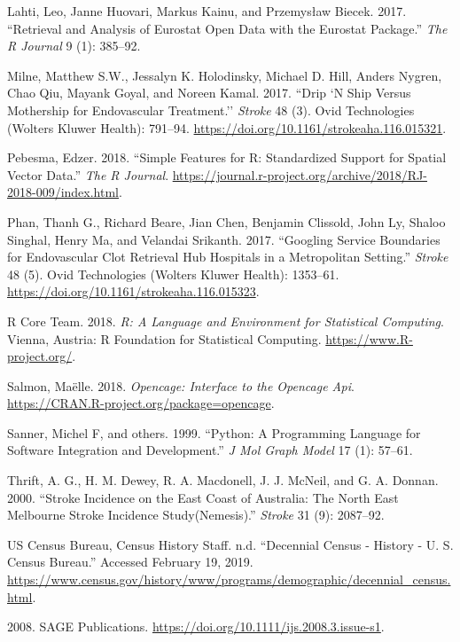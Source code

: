 \documentclass[]{article}
\begin{document}
\leavevmode\hypertarget{ref-Lahti2017}{}%
Lahti, Leo, Janne Huovari, Markus Kainu, and Przemysław Biecek. 2017.
``Retrieval and Analysis of Eurostat Open Data with the Eurostat
Package.'' \emph{The R Journal} 9 (1): 385--92.

\leavevmode\hypertarget{ref-Milne_2017}{}%
Milne, Matthew S.W., Jessalyn K. Holodinsky, Michael D. Hill, Anders
Nygren, Chao Qiu, Mayank Goyal, and Noreen Kamal. 2017. ``Drip `N Ship
Versus Mothership for Endovascular Treatment.'' \emph{Stroke} 48 (3).
Ovid Technologies (Wolters Kluwer Health): 791--94.
\url{https://doi.org/10.1161/strokeaha.116.015321}.

\leavevmode\hypertarget{ref-Pebesma_2018}{}%
Pebesma, Edzer. 2018. ``Simple Features for R: Standardized Support for
Spatial Vector Data.'' \emph{The R Journal}.
\url{https://journal.r-project.org/archive/2018/RJ-2018-009/index.html}.

\leavevmode\hypertarget{ref-Phan_2017}{}%
Phan, Thanh G., Richard Beare, Jian Chen, Benjamin Clissold, John Ly,
Shaloo Singhal, Henry Ma, and Velandai Srikanth. 2017. ``Googling
Service Boundaries for Endovascular Clot Retrieval Hub Hospitals in a
Metropolitan Setting.'' \emph{Stroke} 48 (5). Ovid Technologies (Wolters
Kluwer Health): 1353--61.
\url{https://doi.org/10.1161/strokeaha.116.015323}.

\leavevmode\hypertarget{ref-R_Core_Team_2018}{}%
R Core Team. 2018. \emph{R: A Language and Environment for Statistical
Computing}. Vienna, Austria: R Foundation for Statistical Computing.
\url{https://www.R-project.org/}.

\leavevmode\hypertarget{ref-opencage}{}%
Salmon, Maëlle. 2018. \emph{Opencage: Interface to the Opencage Api}.
\url{https://CRAN.R-project.org/package=opencage}.

\leavevmode\hypertarget{ref-sanner1999python}{}%
Sanner, Michel F, and others. 1999. ``Python: A Programming Language for
Software Integration and Development.'' \emph{J Mol Graph Model} 17 (1):
57--61.

\leavevmode\hypertarget{ref-thrift_stroke_2000}{}%
Thrift, A. G., H. M. Dewey, R. A. Macdonell, J. J. McNeil, and G. A.
Donnan. 2000. ``Stroke Incidence on the East Coast of Australia: The
North East Melbourne Stroke Incidence Study(Nemesis).'' \emph{Stroke} 31
(9): 2087--92.

\leavevmode\hypertarget{ref-us_census_bureau_decennial}{}%
US Census Bureau, Census History Staff. n.d. ``Decennial Census -
History - U. S. Census Bureau.'' Accessed February 19, 2019.
\url{https://www.census.gov/history/www/programs/demographic/decennial_census.html}.

\leavevmode\hypertarget{ref-2008}{}%
2008. SAGE Publications.
\url{https://doi.org/10.1111/ijs.2008.3.issue-s1}.
\end{document}

